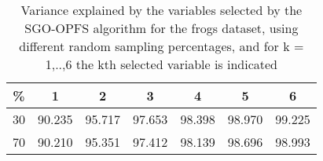 \begin{table}
	\begin{center}
		\begin{tabular}{c c c c c c c}
			\% & 1 & 2 & 3 & 4 & 5 & 6 \\
			\hline
			30 & 90.235 & 95.717 & 97.653 & 98.398 & 98.970 & 99.225 \\
			70 & 90.210 & 95.351 & 97.412 & 98.139 & 98.696 & 98.993 \\
		\end{tabular}
	\end{center}
	\caption{Variance explained by the variables selected by the SGO-OPFS algorithm for the frogs dataset, using different random sampling percentages, and for k = 1,..,6 the kth selected variable is indicated}
\end{table}